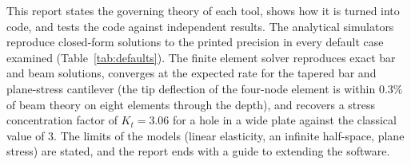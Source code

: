 \documentclass[11pt,a4paper,twoside]{report}
\newcommand{\mainmatter}{\clearpage\pagenumbering{arabic}}
\begin{document}
This report states the governing theory of each tool, shows how it is turned into code, and tests the code against independent results. The analytical simulators reproduce closed-form solutions to the printed precision in every default case examined (Table~\ref{tab:defaults}). The finite element solver reproduces exact bar and beam solutions, converges at the expected rate for the tapered bar and plane-stress cantilever (the tip deflection of the four-node element is within $0.3\%$ of beam theory on eight elements through the depth), and recovers a stress concentration factor of $K_t=3.06$ for a hole in a wide plate against the classical value of $3$. The limits of the models (linear elasticity, an infinite half-space, plane stress) are stated, and the report ends with a guide to extending the software.

\tableofcontents
\listoffigures
\listoftables
\mainmatter
\end{document}
